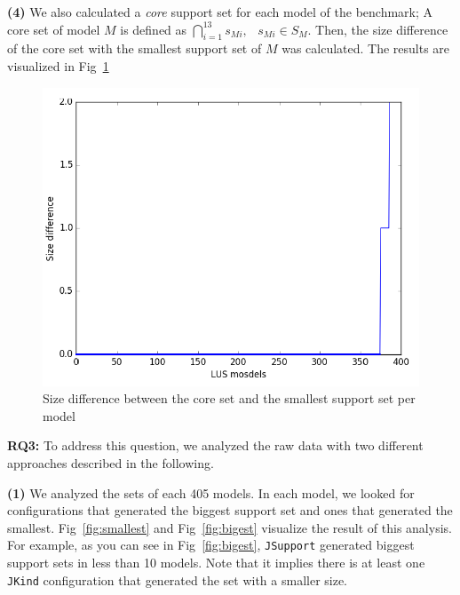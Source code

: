 \textbf{(4)} We also calculated a \emph{core} support set for each model of the benchmark; A core set of model $M$ is defined as
$\bigcap_{i=1}^{13} s_{Mi},   \hspace{9pt} s_{Mi} \in S_M$. Then, the size difference of the core set with the smallest support set of $M$ was calculated. The results are visualized in Fig~\ref{fig:core}


\begin{figure}
  \centering
  \includegraphics[width=\textwidth]{figs/core.png}
  \caption{\small{Size difference between the core set and the smallest support set per model}}\label{fig:core}
\end{figure}

\vspace{6pt}
\noindent{}
 \vspace{9pt}

\textbf{RQ3:} To address this question, we analyzed the raw data with two different approaches described in the following.
 
\textbf{(1)} We analyzed the sets of each 405 models. In each model, we looked for configurations that generated the biggest support set and ones that generated the smallest. Fig~\ref{fig:smallest} and Fig~\ref{fig:bigest} visualize the result of this analysis. For example, as you can see in Fig~\ref{fig:bigest}, \texttt{JSupport} generated biggest support sets in less than 10 models. Note that it implies there is at least one \texttt{JKind} configuration that generated the set with a smaller size.


